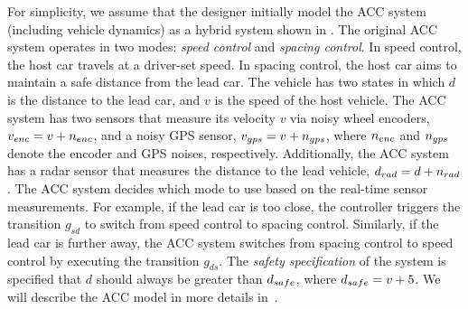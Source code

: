 %
%
For simplicity, we assume that the designer initially model the ACC system (including vehicle dynamics) as a hybrid system shown in .
% 
The original ACC system operates in two modes: \emph{speed control} and \emph{spacing control}. In speed control, the host car travels at a driver-set speed. In spacing control, the host car aims to maintain a safe distance from the lead car. 
%
The vehicle has two states in which $d$ is the distance to the lead car, and $v$ is the speed of the host vehicle. The ACC system has two sensors that measure its velocity $v$ via noisy wheel encoders, $v_{enc} = v + n_{enc}$, and a noisy GPS sensor, $v_{gps} = v+n_{gps}$, where $n_{enc}$ and $n_{gps}$ denote the encoder and GPS noises, respectively. Additionally, the ACC system has a radar sensor that measures the distance to the lead vehicle, $d_{rad} = d+n_{rad}$.
%
The ACC system decides which mode to use based on the real-time sensor measurements. For example, if the lead car is too close, the controller triggers the transition $g_{sd}$ to switch from speed control to spacing control. Similarly, if the lead car is further away, the ACC system switches from spacing control to speed control by executing the transition $g_{ds}$. 
%
The \emph{safety specification} of the system is specified that $d$ should always be greater than $d_{safe}$, where $d_{safe} = v + 5$. We will describe the ACC model in more details in~.
%
% 
%

